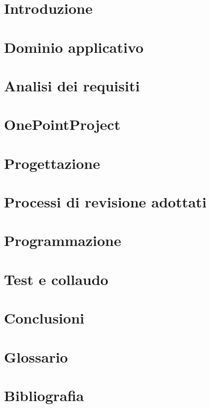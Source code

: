 
%

\def\INDICE		{true} 		%
\def\TABELLE	{true} 		%
\def\FIGURE		{true} 		%




\pagestyle{stilecapitolinumerati}

\section[Introduzione]{Introduzione}

\newpage

\section{Dominio applicativo}

\newpage

\section{Analisi dei requisiti}

\newpage

\section{OnePointProject}

\newpage

\section{Progettazione}

\newpage

\section{Processi di revisione adottati}

\newpage

\section{Programmazione}

\newpage

\section{Test e collaudo}

\newpage

\section{Conclusioni}

\newpage

\pagestyle{stilecapitolinonnumerati}

\section*{Glossario}

\newpage

\section*{Bibliografia}

\newpage

